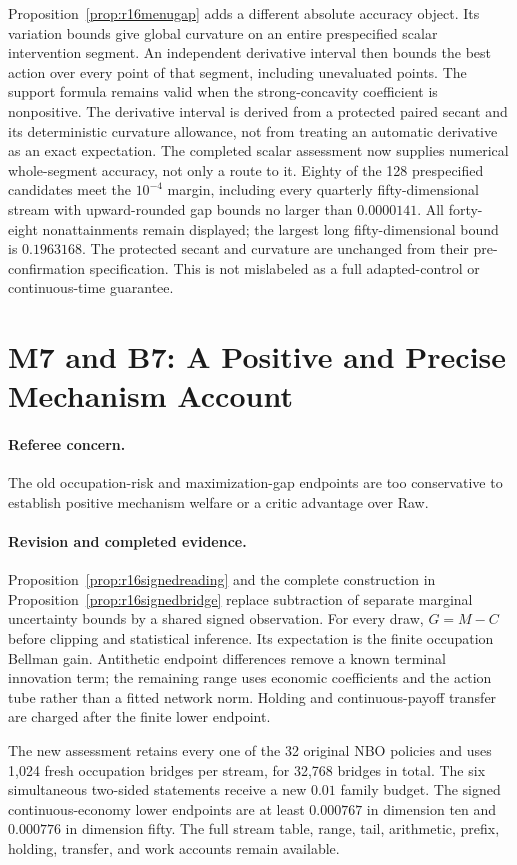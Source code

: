 Proposition~\ref{prop:r16menugap} adds a different absolute accuracy object. Its variation bounds give global curvature on an entire prespecified scalar intervention segment. An independent derivative interval then bounds the best action over every point of that segment, including unevaluated points. The support formula remains valid when the strong-concavity coefficient is nonpositive. The derivative interval is derived from a protected paired secant and its deterministic curvature allowance, not from treating an automatic derivative as an exact expectation. The completed scalar assessment now supplies numerical whole-segment accuracy, not only a route to it. Eighty of the 128 prespecified candidates meet the $10^{-4}$ margin, including every quarterly fifty-dimensional stream with upward-rounded gap bounds no larger than $0.0000141$. All forty-eight nonattainments remain displayed; the largest long fifty-dimensional bound is $0.1963168$. The protected secant and curvature are unchanged from their pre-confirmation specification. This is not mislabeled as a full adapted-control or continuous-time guarantee.

\section{M7 and B7: A Positive and Precise Mechanism Account}
\paragraph*{Referee concern.} The old occupation-risk and maximization-gap endpoints are too conservative to establish positive mechanism welfare or a critic advantage over Raw.

\paragraph*{Revision and completed evidence.} Proposition~\ref{prop:r16signedreading} and the complete construction in Proposition~\ref{prop:r16signedbridge} replace subtraction of separate marginal uncertainty bounds by a shared signed observation. For every draw, $G=M-C$ before clipping and statistical inference. Its expectation is the finite occupation Bellman gain. Antithetic endpoint differences remove a known terminal innovation term; the remaining range uses economic coefficients and the action tube rather than a fitted network norm. Holding and continuous-payoff transfer are charged after the finite lower endpoint.

The new assessment retains every one of the 32 original NBO policies and uses 1,024 fresh occupation bridges per stream, for 32,768 bridges in total. The six simultaneous two-sided statements receive a new $0.01$ family budget. The signed continuous-economy lower endpoints are at least $0.000767$ in dimension ten and $0.000776$ in dimension fifty. The full stream table, range, tail, arithmetic, prefix, holding, transfer, and work accounts remain available.

